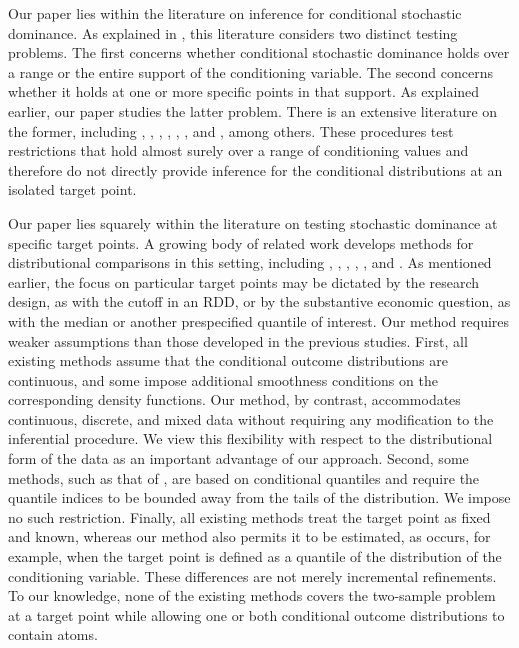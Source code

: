 \documentclass[11pt]{article}
\numberwithin{equation}{section}
\begin{document}
Our paper lies within the literature on inference for conditional stochastic dominance. As explained in \citet[Chapter 4]{whang:2019}, this literature considers two distinct testing problems. The first concerns whether conditional stochastic dominance holds over a range or the entire support of the conditioning variable. The second concerns whether it holds at one or more specific points in that support. As explained earlier, our paper studies the latter problem. There is an extensive literature on the former, including \cite{delgado/escaciano:2013}, \cite{gonzalo/olmo:2014}, \cite{chang-lee-whang-2015-EJ}, \cite{linton/whang/yen:2016}, \cite{andrews-shi-2017-JOE}, \cite{linton/seo/whang:23}, and \cite{wu/kaplan:2025}, among others. These procedures test restrictions that hold almost surely over a range of conditioning values and therefore do not directly provide inference for the conditional distributions at an isolated target point. 


Our paper lies squarely within the literature on testing stochastic dominance at specific target points. A growing body of related work develops methods for distributional comparisons in this setting, including \cite{donald/hsu/barrett:2012}, \cite{qu/yoon:2015}, \cite{shen/zhang:16}, \cite{shen:2019}, \citet[Sections 6.1-6.2]{goldman/kaplan:2018}, and \cite{qu/yoon:2019}. As mentioned earlier, the focus on particular target points may be dictated by the research design, as with the cutoff in an RDD, or by the substantive economic question, as with the median or another prespecified quantile of interest. Our method requires weaker assumptions than those developed in the previous studies. First, all existing methods assume that the conditional outcome distributions are continuous, and some impose additional smoothness conditions on the corresponding density functions. Our method, by contrast, accommodates continuous, discrete, and mixed data without requiring any modification to the inferential procedure. We view this flexibility with respect to the distributional form of the data as an important advantage of our approach. Second, some methods, such as that of \cite{qu/yoon:2019}, are based on conditional quantiles and require the quantile indices to be bounded away from the tails of the distribution. We impose no such restriction. Finally, all existing methods treat the target point as fixed and known, whereas our method also permits it to be estimated, as occurs, for example, when the target point is defined as a quantile of the distribution of the conditioning variable. These differences are not merely incremental refinements. To our knowledge, none of the existing methods covers the two-sample problem at a target point while allowing one or both conditional outcome distributions to contain atoms. 
\end{document}
